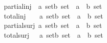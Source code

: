\begin{isabellebody}
partial{\isacharunderscore}inj\ \ {\isacharcolon}{\isacharcolon}{\isachardoublequoteopen}{\isacharbrackleft}{\isacharprime}a\ set{\isacharcomma}{\isacharprime}b\ set{\isacharbrackright}\ {\isacharequal}{\isachargreater}\ {\isacharparenleft}{\isacharprime}a\ {\isacharless}{\isacharequal}{\isachargreater}\ {\isacharprime}b{\isacharparenright}\ set{\isachardoublequoteclose}\ \ \ \ \ {\isacharparenleft}{\isachardoublequoteopen}{\isacharunderscore}\ {\isasympinj}\ {\isacharunderscore}{\isachardoublequoteclose}\ \ {\isacharbrackleft}{}{}{\isacharcomma}{}{}{\isacharbrackright}\ {}{}{\isacharparenright}\isanewline
total{\isacharunderscore}inj\ \ \ \ {\isacharcolon}{\isacharcolon}{\isachardoublequoteopen}{\isacharbrackleft}{\isacharprime}a\ set{\isacharcomma}{\isacharprime}b\ set{\isacharbrackright}\ {\isacharequal}{\isachargreater}\ {\isacharparenleft}{\isacharprime}a\ {\isacharless}{\isacharequal}{\isachargreater}\ {\isacharprime}b{\isacharparenright}\ set{\isachardoublequoteclose}\ \ \ \ \ {\isacharparenleft}{\isachardoublequoteopen}{\isacharunderscore}\ {\isasyminj}\ {\isacharunderscore}{\isachardoublequoteclose}\ \ \ {\isacharbrackleft}{}{}{\isacharcomma}{}{}{\isacharbrackright}\ {}{}{\isacharparenright}\isanewline
partial{\isacharunderscore}surj\ {\isacharcolon}{\isacharcolon}{\isachardoublequoteopen}{\isacharbrackleft}{\isacharprime}a\ set{\isacharcomma}{\isacharprime}b\ set{\isacharbrackright}\ {\isacharequal}{\isachargreater}\ {\isacharparenleft}{\isacharprime}a\ {\isacharless}{\isacharequal}{\isachargreater}\ {\isacharprime}b{\isacharparenright}\ set{\isachardoublequoteclose}\ \ \ \ \ {\isacharparenleft}{\isachardoublequoteopen}{\isacharunderscore}\ {\isasympsurj}\ {\isacharunderscore}{\isachardoublequoteclose}\ {\isacharbrackleft}{}{}{\isacharcomma}{}{}{\isacharbrackright}\ {}{}{\isacharparenright}\isanewline
total{\isacharunderscore}surj\ \ \ {\isacharcolon}{\isacharcolon}{\isachardoublequoteopen}{\isacharbrackleft}{\isacharprime}a\ set{\isacharcomma}{\isacharprime}b\ set{\isacharbrackright}\ {\isacharequal}{\isachargreater}\ {\isacharparenleft}{\isacharprime}a\ {\isacharless}{\isacharequal}{\isachargreater}\ {\isacharprime}b{\isacharparenright}\ set{\isachardoublequoteclose}\ \ \ \ \ {\isacharparenleft}{\isachardoublequoteopen}{\isacharunderscore}\ {\isasymsurj}\ {\isacharunderscore}{\isachardoublequoteclose}\ \ {\isacharbrackleft}{}{}{\isacharcomma}{}{}{\isacharbrackright}\ {}{}{\isacharparenright}\isanewline

\end{isabellebody}
